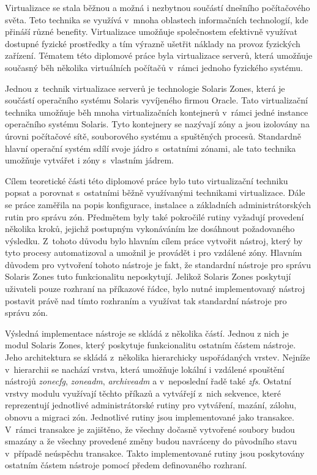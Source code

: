 \label{chapte:conclusion}
Virtualizace se stala běžnou a možná i nezbytnou součástí dnešního počítačového světa. Teto technika se využívá v~mnoha oblastech
informačních technologií, kde přináší různé benefity. Virtualizace umožňuje společnostem efektivně využívat dostupné 
fyzické prostředky a tím výrazně ušetřit náklady na provoz fyzických zařízení. Tématem této diplomové práce byla virtualizace serverů,
která umožňuje současný běh několika virtuálních počítačů v~rámci jednoho fyzického systému.

Jednou z~technik virtualizace serverů je technologie Solaris Zones, která je součástí operačního systému Solaris vyvíjeného firmou Oracle.
Tato virtualizační technika umožňuje běh mnoha virtualizačních kontejnerů v~rámci jedné instance operačního systému Solaris. Tyto
kontejnery se nazývají zóny a jsou izolovány na úrovni počítačové sítě, souborového systému a spuštěných procesů. Standardně hlavní
operační systém sdílí svoje jádro s~ostatními zónami, ale tato technika umožňuje vytvářet i zóny s~vlastním jádrem.

Cílem teoretické části této diplomové práce bylo tuto virtualizační techniku popsat a porovnat s~ostatními běžně využívanými technikami
virtualizace. Dále se práce zaměřila na popis konfigurace, instalace a základních administrátorských rutin pro správu zón.
Předmětem byly také pokročilé rutiny vyžadují provedení několika kroků, jejichž postupným vykonáváním lze dosáhnout požadovaného výsledku. Z~tohoto
důvodu bylo hlavním cílem práce vytvořit nástroj, který by tyto procesy automatizoval a umožnil je provádět i pro vzdálené zóny.
Hlavním důvodem pro vytvoření tohoto nástroje je fakt, že standardní nástroje pro správu Solaris Zones tuto funkcionalitu neposkytují.
Jelikož Solaris Zones poskytují uživateli pouze rozhraní na příkazové řádce, bylo nutné implementovaný nástroj postavit právě nad tímto
rozhraním a využívat tak standardní nástroje pro správu zón.

Výsledná implementace nástroje se skládá z několika částí. Jednou z nich je modul Solaris Zones, který poskytuje funkcionalitu ostatním
částem nástroje. Jeho architektura se skládá z~několika hierarchicky uspořádaných vrstev. Nejníže v~hierarchii se nachází vrstva,
která umožňuje lokální i vzdálené spouštění nástrojů \textit{zonecfg}, \textit{zoneadm}, \textit{archiveadm} a v~neposlední řadě 
také \textit{zfs}. Ostatní vrstvy modulu využívají těchto příkazů a vytvářejí z~nich sekvence, které reprezentují jednotlivé 
administrátorské rutiny pro vytváření, mazání, zálohu, obnovu a migraci zón. Jednotlivé rutiny jsou implementované jako transakce. V~rámci
transakce je zajištěno, že všechny dočasně vytvořené soubory budou smazány a že všechny provedené změny budou navráceny
do původního stavu v~případě neúspěchu transakce. Takto implementované rutiny jsou poskytovány ostatním částem nástroje pomocí
předem definovaného rozhraní. 

